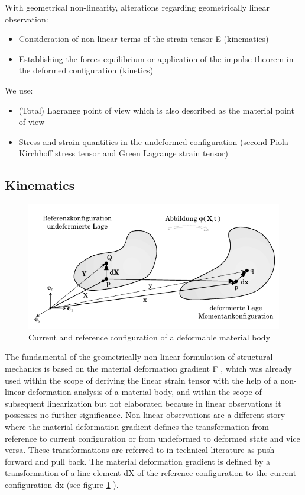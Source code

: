 \label{sec:nonlinear}
\vspace{0.38cm}
\newline
With geometrical non-linearity, alterations regarding geometrically linear observation:
\begin{itemize}
    \item Consideration of non-linear terms of the strain tensor E (kinematics)
     \item Establishing the forces equilibrium or application of the impulse theorem in the deformed
configuration (kinetics)

\end{itemize}
We use: 

\begin{itemize}
    \item  (Total) Lagrange point of view which is also described as the material point of view
     \item Stress and strain quantities in the undeformed configuration (second Piola Kirchhoff
stress tensor and Green Lagrange strain tensor)

\end{itemize}



\subsection{Kinematics}
\begin{figure}[h]
    \centering
    \includegraphics[scale=0.5]{Figures/Chapter2/anh3.png}
    \decoRule   
    \caption{ Current and reference configuration of a deformable material body}
    \label{fig:chap2anh3}
\end{figure}

\noindent
The fundamental of the geometrically non-linear formulation of structural mechanics is based on
the material deformation gradient F , which was already used within the scope of deriving the linear strain tensor  with the help of a non-linear deformation analysis of a material body, and
within the scope of subsequent linearization but not elaborated
because in linear observations it possesses no further significance. Non-linear observations are
a different story where the material deformation gradient defines the transformation from
reference to current configuration or from undeformed to deformed state and vice versa. These
transformations are referred to in technical literature as push forward and pull back. The
material deformation gradient is defined by a transformation of a line element dX of the
reference configuration to the current configuration dx (see figure \ref{fig:chap2anh3} ).

